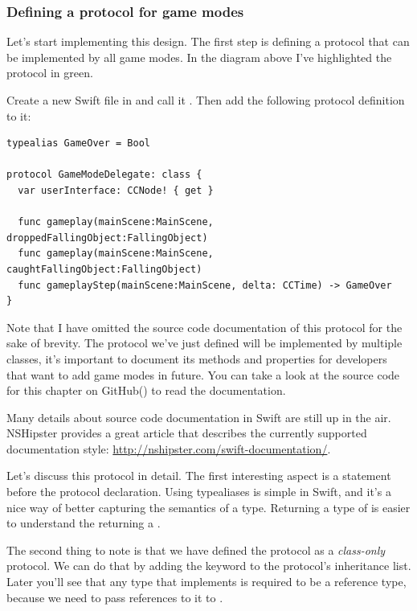 \subsubsection{Defining a protocol for game modes}
Let's start implementing this design. The first step is defining a protocol
that can be implemented by all game modes. In the diagram above I've highlighted
the protocol in green.
\begin{leftbar}
Create a new Swift file in \xcode{} and call it
.
Then add the following protocol definition to it:
\begin{lstlisting}
typealias GameOver = Bool

protocol GameModeDelegate: class {
  var userInterface: CCNode! { get }

  func gameplay(mainScene:MainScene, droppedFallingObject:FallingObject)
  func gameplay(mainScene:MainScene, caughtFallingObject:FallingObject)
  func gameplayStep(mainScene:MainScene, delta: CCTime) -> GameOver
}
\end{lstlisting}
\end{leftbar}
Note that I have omitted the source code documentation of this protocol for the
sake of brevity. The protocol we've just defined will be implemented by
multiple classes, it's important to document its methods and properties for developers that want
to add game modes in future. You can take a look at the source code for
this chapter on GitHub() to read the documentation. %

\begin{details}[frametitle={Source code
documentation in Swift}] Many details about source code documentation in Swift are still up in the air.
NSHipster provides a great article that describes the currently supported
documentation style: \url{http://nshipster.com/swift-documentation/}.
\end{details}

Let's discuss this protocol in detail. The first interesting aspect is a
 statement before the protocol declaration. Using
typealiases is simple in Swift, and it's a nice way of better capturing the
semantics of a type. Returning a type of  is easier to
understand the returning a .

The second thing to note is that we
have defined the protocol as a \textit{class-only} protocol. We can do that by
adding the  keyword to the protocol's inheritance list. Later
you'll see that any type that implements  is
required to be a reference type, because we need to pass references to it to
\cocos{}.

